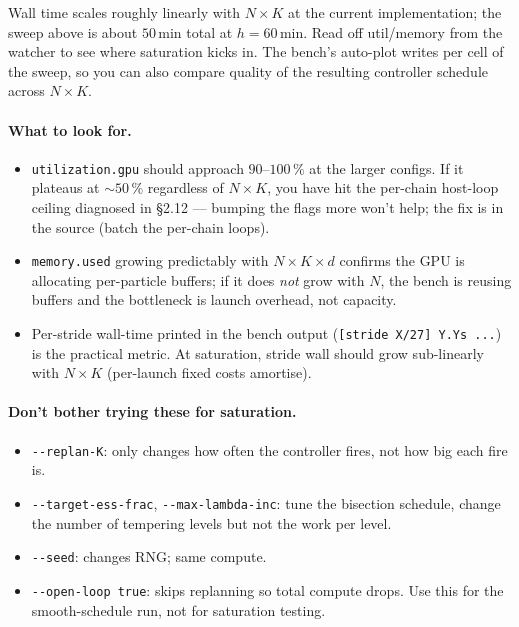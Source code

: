 \documentclass[11pt,a4paper]{article}
\begin{document}
Wall time scales roughly linearly with $N \times K$ at the current
implementation; the sweep above is about $50\,$min total at
$h=60\,$min. Read off util/memory from the watcher to see where
saturation kicks in. The bench's auto-plot writes
 per cell of the sweep, so you
can also compare quality of the resulting controller schedule
across $N \times K$.

\paragraph{What to look for.}

\begin{itemize}[itemsep=2pt,leftmargin=*]
\item \texttt{utilization.gpu} should approach $90$--$100\,\%$ at the
  larger configs. If it plateaus at $\sim 50\,\%$ regardless of
  $N \times K$, you have hit the per-chain host-loop ceiling
  diagnosed in \S 2.12 --- bumping the flags more won't help; the
  fix is in the source (batch the per-chain loops).
\item \texttt{memory.used} growing predictably with
  $N \times K \times d$ confirms the GPU is allocating
  per-particle buffers; if it does \emph{not} grow with $N$, the
  bench is reusing buffers and the bottleneck is launch overhead,
  not capacity.
\item Per-stride wall-time printed in the bench output
  (\texttt{[stride X/27] Y.Ys ...}) is the practical metric. At
  saturation, stride wall should grow sub-linearly with $N \times K$
  (per-launch fixed costs amortise).
\end{itemize}

\paragraph{Don't bother trying these for saturation.}

\begin{itemize}[itemsep=2pt,leftmargin=*]
\item \texttt{-{}-replan-K}: only changes how often the controller
  fires, not how big each fire is.
\item \texttt{-{}-target-ess-frac}, \texttt{-{}-max-lambda-inc}: tune the
  bisection schedule, change the number of tempering levels but not
  the work per level.
\item \texttt{-{}-seed}: changes RNG; same compute.
\item \texttt{-{}-open-loop true}: skips replanning so total compute
  drops. Use this for the smooth-schedule run, not for saturation
  testing.
\end{itemize}
\end{document}
